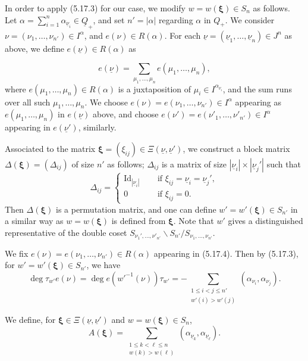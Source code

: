 \documentclass[12pt]{amsart}
\renewcommand\a{\alpha}
\renewcommand\t{\tau}
\newcommand\vD{\varDelta}
\renewcommand{\1}{\mathbb 1}
\newcommand\Bxi{\boldsymbol\xi}
\newcommand\iv{^{-1}}
\newcommand\ul{\underline}
\newcommand\Id{\operatorname{Id}}
\numberwithin{equation}{section}
\begin{document}
In order to apply (5.17.3) for our case, 
we modify $w = w(\Bxi) \in S_n$ as follows.
Let $\a = \sum_{i=1}^n\a_{\ul\nu_i} \in \ul Q_+$, and set $n' = |\a|$
regarding $\a$ in  $Q_+$. 
We consider $\nu = (\nu_1, \dots, \nu_{n'}) \in I^{\a}$, and 
$e(\nu) \in R(\a)$.
For each $\ul\nu = (\ul\nu_1, \dots, \ul\nu_n) \in J^n$ as above,
we define $e(\ul\nu) \in R(\a)$ as

\begin{equation*}
\tag{5.17.4}  
e(\ul\nu) = \sum_{\mu_1, \dots, \mu_n}e(\mu_1, \dots, \mu_n),
\end{equation*}
where $e(\mu_1, \dots, \mu_n) \in R(\a)$ is a juxtaposition of $\mu_i \in I^{\a_{\ul\nu_i}}$,
and the sum runs over all such $\mu_1, \dots, \mu_n$. 
We choose $e(\nu) = e(\nu_1, \dots, \nu_{n'}) \in I^{\a}$
appearing as $e(\mu_1, \dots, \mu_n)$ in $e(\ul\nu)$ above,  
and choose $e(\nu') = e(\nu'_1, \dots,\nu'_{n'}) \in I^{\a}$
appearing in $e(\ul\nu')$, similarly. 
\par
Associated to the matrix $\Bxi = (\xi_{ij}) \in \Xi(\ul\nu, \ul\nu')$,
we construct a block matrix $\vD(\Bxi) = (\vD_{ij})$
of size $n'$ as follows; $\vD_{ij}$ is a matrix of size $|\ul\nu_i| \times |\ul\nu_j'|$ 
such that
\begin{equation*}
\vD_{ij} = \begin{cases}
              \Id_{|\ul\nu_i|}   &\quad\text{ if } \xi_{ij} = \ul\nu_i = \ul\nu_j', \\
              0                  &\quad\text{ if } \xi_{ij} = 0. 
           \end{cases}      
\end{equation*}
Then $\vD(\Bxi)$ is a permutation matrix, and one can define $w' = w'(\Bxi) \in S_{n'}$
in a similar way as $w = w(\Bxi)$ is defined from $\Bxi$.
Note that $w'$ gives a distinguished representative of the double coset
$S_{\nu_1', \dots, \nu'_{n'}}\backslash S_{n'}/S_{\nu_1, \dots, \nu_{n'}}$.  
\par
We fix $e(\nu) = e(\nu_1, \dots, \nu_{n'}) \in R(\a)$ appearing in (5.17.4).
Then by (5.17.3), for $w' = w'(\Bxi) \in S_{n'}$, we have
\begin{equation*}
\tag{5.17.5}  
  \deg \t_{w'}e(\nu) = \deg e({w'}\iv(\nu))\t_{w'}
  = -\sum_{\substack{1 \le i < j \le n'  \\ w'(i) > w'(j)}}
        (\a_{\nu_i}, \a_{\nu_j}). 
\end{equation*}  

We define, for $\Bxi \in \Xi(\ul\nu, \ul\nu')$ and $w = w(\Bxi) \in S_n$, 
\begin{equation*}
\tag{5.17.6}  
  A(\Bxi) = \sum_{\substack{1 \le k < \ell \le n \\ w(k) > w(\ell)}}
                 (\a_{\ul\nu_k}, \a_{\ul\nu_{\ell}}).
\end{equation*}  
\end{document}
